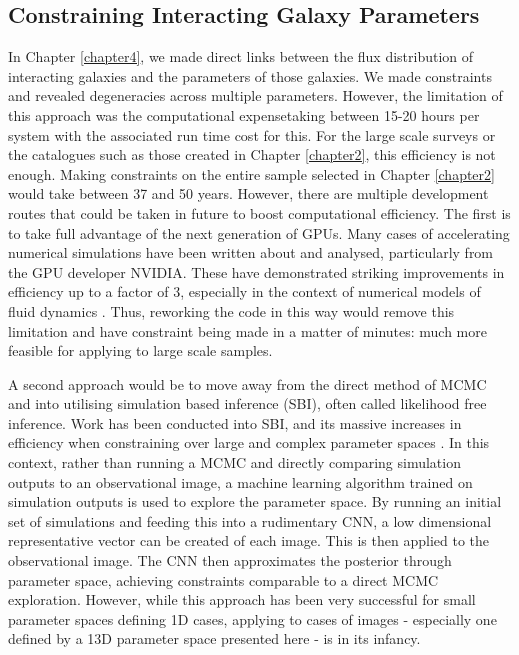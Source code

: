 \subsection{Constraining Interacting Galaxy Parameters}
\noindent In Chapter \ref{chapter4}, we made direct links between the flux distribution of interacting galaxies and the parameters of those galaxies. We made constraints and revealed degeneracies across multiple parameters. However, the limitation of this approach was the computational expense\DIFdelbegin \DIFdel{: }\DIFdelend \DIFaddbegin \DIFadd{, }\DIFaddend taking between 15-20 hours per system with the associated run time cost for this. For the large scale surveys or the catalogues such as those created in Chapter \ref{chapter2}, this efficiency is not enough. Making constraints on the entire sample selected in Chapter \ref{chapter2} would take between 37 and 50 years. However, there are multiple development routes that could be taken in future to boost computational efficiency. The first is to take full advantage of the next generation of GPUs. Many cases of accelerating numerical simulations have been written about and analysed, particularly from the GPU developer NVIDIA. These have demonstrated striking improvements in efficiency up to a factor of 3, especially in the context of numerical models of fluid dynamics \citep[recent examples include][]{Mantas2016, COSTA2021502}. Thus, reworking the code in this way would remove this limitation and have constraint being made in a matter of minutes: much more feasible for applying to large scale samples.

A second approach would be to move away from the direct method of MCMC and into utilising simulation based inference (SBI), often called likelihood free inference. Work has been conducted into SBI, and its massive increases in efficiency when constraining over large and complex parameter spaces \citep[for an excellent description of likelihood free inference, see][]{2021MNRAS.501..954J}. In this context, rather than running a MCMC and directly comparing simulation outputs to an observational image, a machine learning algorithm trained on simulation outputs is used to explore the parameter space. By running an initial set of simulations and feeding this into a rudimentary CNN, a low dimensional representative vector can be created of each image. This is then applied to the observational image. The CNN then approximates the posterior through parameter space, achieving constraints comparable to a direct MCMC exploration. However, while this approach has been very successful for small parameter spaces defining 1D cases, applying to cases of images - especially one defined by a 13D parameter space presented here - is in its infancy. 

